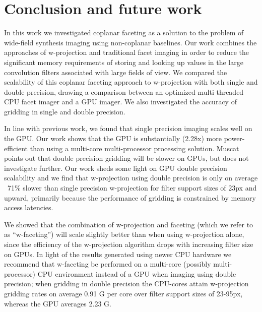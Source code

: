\chapter{Conclusion and future work}
In this work we investigated coplanar faceting as a solution to the problem of wide-field synthesis imaging using non-coplanar baselines.
Our work combines the approaches of w-projection and traditional facet imaging in order to reduce the significant memory requirements of 
storing and looking up values in the large convolution filters associated with large fields of view. We compared the scalability of this coplanar
faceting approach to w-projection with both single and double precision, drawing a comparison between an optimized multi-threaded CPU facet imager and a 
GPU imager. We also investigated the accuracy of gridding in single and double precision.

In line with previous work, we found that single precision imaging scales well on the GPU. Our work shows that the GPU is substantially (2.28x) more 
power-efficient than using a multi-core multi-processor processing solution. Muscat \cite{muscat2014high} points out that double precision 
gridding will be slower on GPUs, but does not investigate further. Our work sheds some light on GPU double precision scalability and we find that w-projection
using double precision is only on average ~71\% slower than single precision w-projection for filter support sizes of 23px and upward, primarily because 
the performance of gridding is constrained by memory access latencies. 

We showed that the combination of w-projection and faceting (which we refer to as ``w-faceting'') will scale slightly better than when using w-projection alone, 
since the efficiency of the w-projection algorithm drops with increasing filter size on GPUs. In light of the results generated using newer CPU hardware we recommend that w-faceting be
performed on a multi-core (possibly multi-processor) CPU environment instead of a GPU when imaging using double precision; when gridding in double precision the 
CPU-cores attain w-projection gridding rates on average 0.91 G per core over filter support sizes of 23-95px, whereas the GPU averages 2.23 G.

